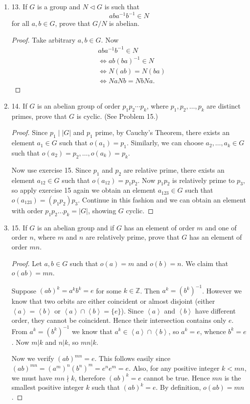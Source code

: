 \begin{enumerate}[resume]
	\item 13. If $G$ is a group and $N \triangleleft G$ is such that
\[
a b a^{-1} b^{-1} \in N
\]
for all $a, b \in G$, prove that $G / N$ is abelian.
\begin{proof}
	Take arbitrary $a, b \in G$. Now
	\begin{align*}
		& a b a^{-1} b^{-1} \in N \\
		&\iff  a b (ba)^{-1} \in N \\
		&\iff N(ab) = N(ba) \\
		&\iff NaNb=NbNa
	.\end{align*}
\end{proof}

	\item 14. If $G$ is an abelian group of order $p_1 p_2 \cdots p_k$, where $p_1, p_2, \ldots, p_k$ are distinct primes, prove that $G$ is cyclic. (See Problem 15.)
\begin{proof}
	Since $p_1 \mid |G|$ and $p_1$ prime, by Cauchy's Theorem, there exists an element $a_1 \in G$ such that $o(a_1) = p_1$. Similarly, we can choose $a_2, \ldots, a_k \in G$ such that $o(a_2) = p_2, \ldots, o(a_k) = p_k$.

	Now use exercise 15. Since $p_1$ and $p_2$ are relative prime, there exists an element $a_{12} \in G$ such that $o(a_{12}) = p_1p_2$. Now $p_1p_2$ is relatively prime to $p_3$, so apply exercise 15 again we obtain an element $a_{123} \in G$ such that $o(a_{123}) = (p_1p_2)p_3$. Continue in this fashion and we can obtain an element with order $p_1p_2\ldots p_k = |G|$, showing $G$ cyclic.
\end{proof}

	\item 15. If $G$ is an abelian group and if $G$ has an element of order $m$ and one of order $n$, where $m$ and $n$ are relatively prime, prove that $G$ has an element of order $m n$.
\begin{proof}
	Let $a, b \in G$ such that $o(a) = m$ and $o(b) = n$. We claim that $o(ab) = mn $.

	Suppose $(ab)^k = a^k b^k = e$ for some $k \in \mathbb{Z}$. Then $a^k = (b^k)^{-1}$. However we know that two orbits are either coincident or almost disjoint (either $\left\langle a \right\rangle = \left\langle b \right\rangle $ or $\left\langle a \right\rangle \cap \left\langle b \right\rangle  = \{e\} $).
	Since $\left\langle a \right\rangle $ and $\left\langle b \right\rangle $ have different order, they cannot be coincident. Hence their intersection contains only $e$.
	From $a^k = (b^k)^{-1}$ we know that $a^k \in \left\langle a \right\rangle \cap \left\langle b \right\rangle $, so $a^k = e$, whence  $b^k = e$. Now $m|k$ and $n|k$, so $mn | k$. 

	Now we verify $(ab)^{mn} = e$. This follows easily since $(ab)^{mn }=\left( a^m \right) ^n \left( b^n \right) ^m = e^n e^m = e$. Also, for any positive integer $k< mn$, we must have $mn \nmid k$, therefore $(ab)^k = e$ cannot be true. Hence $mn $ is the smallest positive integer $k$ such that $(ab)^k  = e$. By definition, $o(ab) = mn $.
\end{proof}

\end{enumerate}
